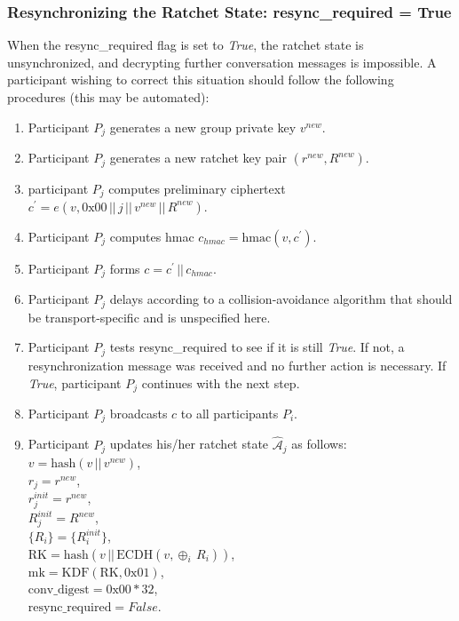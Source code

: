 \documentclass[%
preprint,
amsmath,amssymb,
aps,
prb,
floatfix,
]{revtex4-1}
\begin{document}
\subsubsection{\label{sec:sendresync}Resynchronizing the Ratchet State:
resync\_required = True}
When the resync\_required flag is set to \textit{True}, the ratchet state is
unsynchronized, and decrypting further conversation messages is impossible.
A participant wishing to correct this situation should follow the following
procedures (this may be automated):
\begin{enumerate}
\item Participant $P_j$ generates a new group private key $v^{new}$.
\item Participant $P_j$ generates a new ratchet key  pair $(r^{new}, R^{new})$.
\item participant $P_j$ computes preliminary ciphertext $c^\prime = e(v, 0\mathrm{x}00
\, || \, j \, || \, v^{new} \, || \, R^{new})$.
\item Participant $P_j$ computes hmac $c_{hmac} = \mathrm{hmac}(v, c^\prime)$.
\item Participant $P_j$ forms $c = c^\prime \, || \, c_{hmac}$.
\item Participant $P_j$ delays according to a collision-avoidance algorithm
that should be transport-specific and is unspecified here.
\item Participant $P_j$ tests resync\_required to see if it is still
\textit{True}. If not, a resynchronization message was received and no further
action is necessary. If \textit{True}, participant $P_j$ continues with the next
step.
\item Participant $P_j$ broadcasts $c$ to all participants $P_i$.
\item Participant $P_j$ updates his/her ratchet state
$\mathcal{\hat{A}}_j$ as follows:\\
$v = \mathrm{hash}(v \, || \, v^{new})$, \\
$r_j = r^{new}$, \\
$r_j^{init} = r^{new}$, \\
$R_j^{init} = R^{new}$, \\
$\{R_i\} = \{R_i^{init}\}$, \\
$\mathrm{RK} = \mathrm{hash}(v \, || \, \mathrm{ECDH}(v, \oplus_i
\, R_i))$, \\
$\mathrm{mk} = \mathrm{KDF}(\mathrm{RK}, 0\mathrm{x}01)$, \\
$\mathrm{conv\_digest} = 0\mathrm{x}00 * 32$, \\
$\mathrm{resync\_required} = False$.
\end{enumerate}
\end{document}
